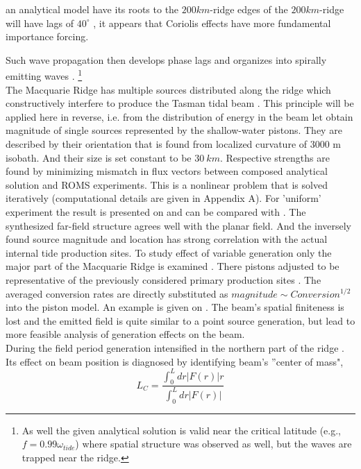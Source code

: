 \documentclass[12pt]{article}
\begin{document}
 an analytical model 
have 
its roots to 
 the 
$200km$-ridge edges of the $200km$-ridge will have lags of $40^{\circ}$   , it 
appears 
that Coriolis effects have more fundamental importance 
forcing. 

Such wave propagation then 
develops phase lags and organizes into spirally emitting waves \citep{baines2007internal}. 
\footnote{As well the given analytical solution is valid near 
the critical latitude (e.g., $f = 0.99 \omega_{tide}$) where spatial structure was observed as 
well, but the waves are trapped near the ridge.}\\

The Macquarie Ridge has multiple sources distributed along the ridge which constructively 
interfere to produce the Tasman tidal beam \citep{rainville2010interference, 
klymak2016reflection}. This principle will be applied here in reverse, i.e. from the distribution 
of energy in the beam let obtain magnitude of single sources represented by the shallow-water 
pistons. They are described by their orientation that is found from localized curvature of $3000$ m 
isobath. And their size is set constant to be $30~km$. Respective strengths are found by minimizing 
mismatch in flux vectors between composed analytical solution and ROMS experiments. This is a 
nonlinear problem that is solved iteratively (computational details are given in Appendix A). 
For 'uniform' experiment the result is presented on  and can be compared 
with . The synthesized far-field structure agrees well with the planar field. 
And the inversely found source magnitude and location has strong correlation with the actual 
internal tide production sites. To study effect of variable generation only the major part of the 
Macquarie Ridge is examined . There pistons adjusted to be representative of 
the previously considered primary production sites . The averaged conversion 
rates are directly substituted as $magnitude \sim Conversion^{1/2}$ into the piston model. An 
example is given on . The beam's spatial finiteness is lost and the 
emitted field is quite similar to a point source generation, but lead to more feasible analysis of 
generation effects on the beam.\\
During the field period generation intensified in the northern part of the ridge 
. Its effect on beam position is diagnosed by identifying beam's 
''center of mass",
\begin{equation}
L_{C} = \frac{\int_0^{L} dr |F(r)|r}{\int_0^{L} dr |F(r)|}
\end{equation}
\end{document}
